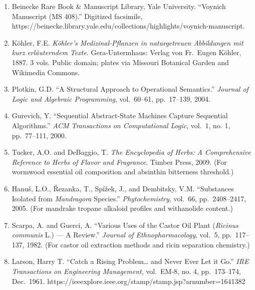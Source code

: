 \documentclass[12pt,a4paper]{article}
\begin{document}
\begin{enumerate}
\def\labelenumi{\arabic{enumi}.}
\item
  Beinecke Rare Book \& Manuscript Library, Yale University. ``Voynich
  Manuscript (MS 408).'' Digitized facsimile,
  https://beinecke.library.yale.edu/collections/highlights/voynich-manuscript.
\item
  Köhler, F.E. \emph{Köhler's Medizinal-Pflanzen in naturgetreuen
  Abbildungen mit kurz erläuterndem Texte}. Gera-Untermhaus: Verlag von
  Fr.~Eugen Köhler, 1887. 3 vols. Public domain; plates via Missouri
  Botanical Garden and Wikimedia Commons.
\item
  Plotkin, G.D. ``A Structural Approach to Operational Semantics.''
  \emph{Journal of Logic and Algebraic Programming}, vol.~60--61,
  pp.~17--139, 2004.
\item
  Gurevich, Y. ``Sequential Abstract-State Machines Capture Sequential
  Algorithms.'' \emph{ACM Transactions on Computational Logic}, vol.~1,
  no. 1, pp.~77--111, 2000.
\item
  Tucker, A.O. and DeBaggio, T. \emph{The Encyclopedia of Herbs: A
  Comprehensive Reference to Herbs of Flavor and Fragrance}. Timber
  Press, 2009. (For wormwood essential oil composition and absinthin
  bitterness threshold.)
\item
  Hanuš, L.O., Řezanka, T., Spížek, J., and Dembitsky, V.M. ``Substances
  Isolated from \emph{Mandragora} Species.'' \emph{Phytochemistry},
  vol.~66, pp.~2408--2417, 2005. (For mandrake tropane alkaloid profiles
  and withanolide content.)
\item
  Scarpa, A. and Guerci, A. ``Various Uses of the Castor Oil Plant
  (\emph{Ricinus communis} L.) --- A Review.'' \emph{Journal of
  Ethnopharmacology}, vol.~5, pp.~117--137, 1982. (For castor oil
  extraction methods and ricin separation chemistry.)
\item
  Larson, Harry T. ``Catch a Rising Problem\ldots{} and Never Ever Let
  it Go.'' \emph{IRE Transactions on Engineering Management}, vol.~EM-8,
  no. 4, pp.~173--174, Dec.~1961.
  https://ieeexplore.ieee.org/stamp/stamp.jsp?arnumber=1641382
\end{enumerate}
\end{document}
